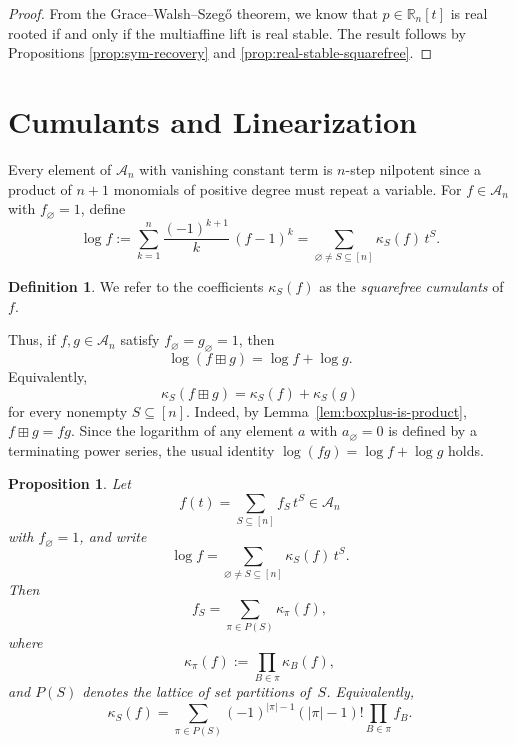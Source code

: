 \documentclass[11pt]{amsart}
\newtheorem{prop}[thm]{Proposition}
\theoremstyle{definition}
\newtheorem{defn}[thm]{Definition}
\DeclareMathOperator{\Sym}{Sym}
\begin{document}
\begin{proof}
    From the Grace--Walsh--Szeg\H{o} theorem, we know that $p\in \mathbb R_n[t]$ is real rooted if and only if the multiaffine lift is real stable. The result follows by Propositions \ref{prop:sym-recovery} and \ref{prop:real-stable-squarefree}.
\end{proof}




\section{Cumulants and Linearization}
\label{sec:cumulants}

Every element of $\mathcal{A}_n$ with vanishing constant term is $n$-step nilpotent since a product of $n+1$ monomials of positive degree must repeat a variable.  For $f\in\mathcal{A}_n$ with $f_\varnothing=1$, define
\begin{equation}\label{eq:nilpotent-log}
  \log f := \sum_{k=1}^{n}
  \frac{(-1)^{k+1}}{k}\,(f-1)^k
  = \sum_{\varnothing\neq S\subseteq[n]}
  \kappa_S(f)\, t^S.
\end{equation}

\begin{defn}
    We refer to the coefficients $\kappa_S(f)$ as the \emph{squarefree cumulants} of $f$.
\end{defn}

Thus, if $f,g\in\mathcal{A}_n$ satisfy $f_\varnothing = g_\varnothing = 1$, then
\[
  \log(f\boxplus g) = \log f + \log g.
\]
Equivalently,
\[
  \kappa_S(f\boxplus g) = \kappa_S(f)+\kappa_S(g)
\]
for every nonempty $S\subseteq[n]$. Indeed, by Lemma~\ref{lem:boxplus-is-product}, $f\boxplus g = fg$.  Since the logarithm of any element $a$ with $a_\varnothing =0$ is defined by a terminating power series, the usual identity $\log(fg)=\log f+\log g$ holds.


\begin{prop} \label{prop:log-cumulant-formula}
Let
\[
  f(t)=\sum_{S\subseteq[n]} f_S\, t^S
  \in \mathcal{A}_n
\]
with $f_\varnothing=1$, and write
\[
  \log f
  =
  \sum_{\varnothing\neq S\subseteq[n]}
  \kappa_S(f)\, t^S.
\]
Then
\begin{equation}
      f_S = \sum_{\pi\in P(S)} \kappa_\pi(f),
\end{equation}
where
\[
  \kappa_\pi(f)
  :=
  \prod_{B\in\pi}\kappa_B(f),
\]
and $P(S)$ denotes the lattice of set partitions of~$S$.
Equivalently,
\begin{equation}
    \kappa_S(f)=
    \sum_{\pi\in P(S)} (-1)^{|\pi|-1}(|\pi|-1)! \prod_{B\in\pi} f_B.
\end{equation}
\end{prop}
\end{document}
